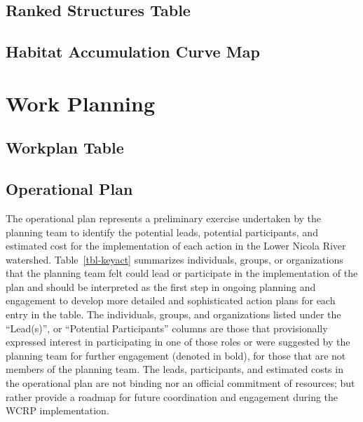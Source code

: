 \documentclass[
  letterpaper,
  DIV=11,
  numbers=noendperiod]{scrreprt}
\begin{document}
\hypertarget{ranked-structures-table}{%
\section*{Ranked Structures Table}\label{ranked-structures-table}}


\hypertarget{habitat-accumulation-curve-map-1}{%
\section*{Habitat Accumulation Curve \textbar{}
Map}\label{habitat-accumulation-curve-map-1}}



\hypertarget{work-planning}{%
\chapter{Work Planning}\label{work-planning}}

\hypertarget{workplan-table}{%
\section*{Workplan Table}\label{workplan-table}}


\hypertarget{operational-plan}{%
\section*{Operational Plan}\label{operational-plan}}


The operational plan represents a preliminary exercise undertaken by the
planning team to identify the potential leads, potential participants,
and estimated cost for the implementation of each action in the Lower
Nicola River watershed. Table~\ref{tbl-keyact} summarizes individuals,
groups, or organizations that the planning team felt could lead or
participate in the implementation of the plan and should be interpreted
as the first step in ongoing planning and engagement to develop more
detailed and sophisticated action plans for each entry in the table. The
individuals, groups, and organizations listed under the ``Lead(s)'', or
``Potential Participants'' columns are those that provisionally
expressed interest in participating in one of those roles or were
suggested by the planning team for further engagement (denoted in bold),
for those that are not members of the planning team. The leads,
participants, and estimated costs in the operational plan are not
binding nor an official commitment of resources; but rather provide a
roadmap for future coordination and engagement during the WCRP
implementation.
\end{document}
